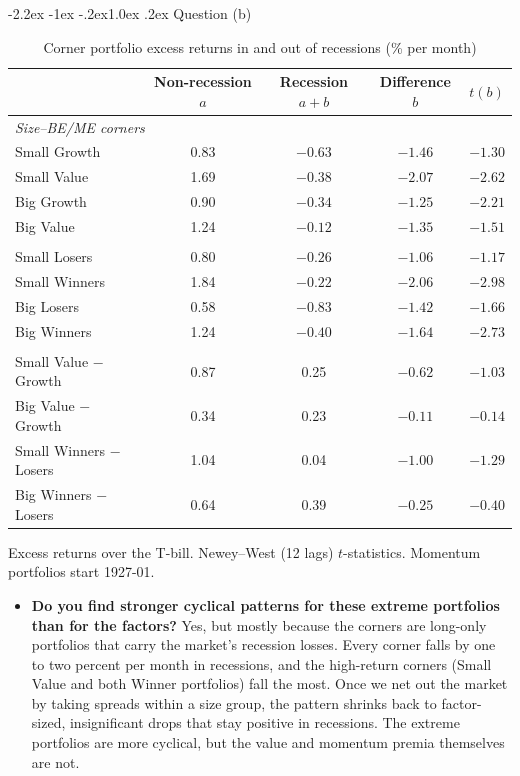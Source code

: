 \documentclass[11pt]{article}
\makeatletter
\renewcommand\subsection{\@startsection{subsection}{2}{0pt}%
  {-2.2ex \@plus -1ex \@minus -.2ex}{1.0ex \@plus .2ex}%
  {\normalfont\bfseries\normalsize\color{psink}}}
\newenvironment{tight}
  {\begin{itemize}\setlength{\itemsep}{3pt}\setlength{\parskip}{0pt}%
   \setlength{\topsep}{3pt}\setlength{\leftmargini}{1.4em}}
  {\end{itemize}}
\makeatother
\begin{document}
\subsection{Question (b)}

\begin{table}[H]\centering\small
\caption{Corner portfolio excess returns in and out of recessions (\% per month)}
\begin{tabular}{lcccc}
\toprule
 & Non-recession $a$ & Recession $a+b$ & Difference $b$ & $t(b)$ \\
\midrule
\multicolumn{5}{l}{\textit{Size--BE/ME corners}} \\
Small Growth & 0.83 & $-0.63$ & $-1.46$ & $-1.30$ \\
Small Value  & 1.69 & $-0.38$ & $-2.07$ & $-2.62$ \\
Big Growth   & 0.90 & $-0.34$ & $-1.25$ & $-2.21$ \\
Big Value    & 1.24 & $-0.12$ & $-1.35$ & $-1.51$ \\
\addlinespace
\multicolumn{5}{l}{\textit{Size--momentum corners}} \\
Small Losers  & 0.80 & $-0.26$ & $-1.06$ & $-1.17$ \\
Small Winners & 1.84 & $-0.22$ & $-2.06$ & $-2.98$ \\
Big Losers    & 0.58 & $-0.83$ & $-1.42$ & $-1.66$ \\
Big Winners   & 1.24 & $-0.40$ & $-1.64$ & $-2.73$ \\
\addlinespace
\multicolumn{5}{l}{\textit{Within-size spreads}} \\
Small Value $-$ Growth   & 0.87 & 0.25 & $-0.62$ & $-1.03$ \\
Big Value $-$ Growth     & 0.34 & 0.23 & $-0.11$ & $-0.14$ \\
Small Winners $-$ Losers & 1.04 & 0.04 & $-1.00$ & $-1.29$ \\
Big Winners $-$ Losers   & 0.64 & 0.39 & $-0.25$ & $-0.40$ \\
\bottomrule
\end{tabular}
\par\smallskip\footnotesize Excess returns over the T-bill. Newey--West (12 lags)
$t$-statistics. Momentum portfolios start 1927-01.
\end{table}

\begin{tight}
  \item \textbf{Do you find stronger cyclical patterns for these extreme portfolios
  than for the factors?} Yes, but mostly because the corners are long-only portfolios that
  carry the market's recession losses. Every corner falls by one to two percent per
  month in recessions, and the high-return corners (Small Value and both
  Winner portfolios) fall the most. Once we net out the market by taking
  spreads within a size group, the pattern shrinks back to factor-sized, insignificant
  drops that stay positive in recessions. The extreme portfolios are more cyclical,
  but the value and momentum premia themselves are not.
\end{tight}
\end{document}
